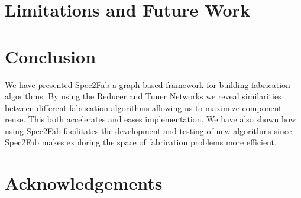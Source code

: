\documentclass[annual]{acmsiggraph}
\begin{document}
\section{Limitations and Future Work}


\section{Conclusion}
We have presented Spec2Fab a graph based framework for building fabrication algorithms. By using the Reducer and Tuner Networks we reveal similarities between different fabrication algorithms allowing us to maximize component reuse. This both accelerates and eases implementation. We have also shown how using Spec2Fab facilitates the development and testing of new algorithms since Spec2Fab makes exploring the space of fabrication problems more efficient.
\section*{Acknowledgements}



\end{document}
